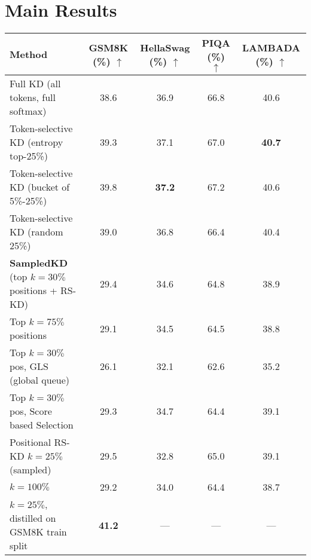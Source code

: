 \documentclass[11pt]{article}
\begin{document}
\section{Main Results}
\label{sec:main-results}
\begin{table*}[t]
	\centering
	\small
	\setlength{\tabcolsep}{8pt}
	\begin{tabular}{lcccc}
		\toprule
		Method                                              & GSM8K (\%) $\uparrow$ & HellaSwag (\%) $\uparrow$ & PIQA (\%) $\uparrow$ & LAMBADA (\%) $\uparrow$ \\
		\midrule
		Full KD (all tokens, full softmax)                  & 38.6                  & 36.9                      & 66.8                 & 40.6                    \\
		Token-selective KD (entropy top-25\%)               & 39.3                  & 37.1                      & 67.0                 & \textbf{40.7}           \\
		Token-selective KD (bucket of 5\%-25\%)             & 39.8                  & \textbf{37.2}             & 67.2                 & 40.6                    \\
		Token-selective KD (random 25\%)                    & 39.0                  & 36.8                      & 66.4                 & 40.4                    \\
		\textbf{SampledKD} (top $k=30\%$ positions + RS-KD) & 29.4                  & 34.6                      & 64.8                 & 38.9                    \\
		\quad Top $k=75\%$ positions                        & 29.1                  & 34.5                      & 64.5                 & 38.8                    \\
		\quad Top $k=30\%$ pos, GLS (global queue)          & 26.1                  & 32.1                      & 62.6                 & 35.2                    \\
		\quad Top $k=30\%$ pos, Score based Selection       & 29.3                  & 34.7                      & 64.4                 & 39.1                    \\
		\quad Positional RS-KD $k=25\%$ (sampled)           & 29.5                  & 32.8                      & 65.0                 & 39.1                    \\
		\quad $k=100\%$                                     & 29.2                  & 34.0                      & 64.4                 & 38.7                    \\
		\quad $k=25\%$, distilled on GSM8K train split      & \textbf{41.2}         & ---                       & ---                  & ---                     \\

\end{tabular}
\end{table*}
\end{document}
